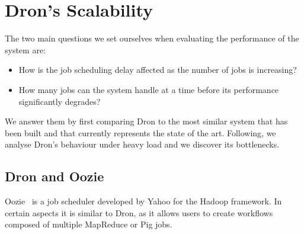 \documentclass[11pt,a4paper,twoside]{report}
\begin{document}


\section{Dron's Scalability}
The two main questions we set ourselves when evaluating the performance of the system are:
\begin{itemize}
\item{}
How is the job scheduling delay affected as the number of jobs is increasing?
\item{}
How many jobs can the system handle at a time before its performance significantly degrades?
\end{itemize}


We answer them by first comparing Dron to the most similar system that has been built and that currently represents the state of the art. Following, we analyse Dron's behaviour under heavy load and we discover its bottlenecks.

\subsection{Dron and Oozie}
Oozie~\cite{Oozie} is a job scheduler developed by Yahoo for the Hadoop framework. In certain aspects it is similar to Dron, as it allows users to create workflows composed of multiple MapReduce or Pig jobs.
\end{document}
